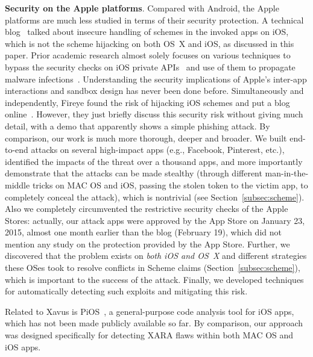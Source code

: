 \documentclass{article}
\newcommand{\ignore}[1]{}
\begin{document}
\vspace {3pt}\noindent\textbf{Security on the Apple platforms}. Compared with Android, the Apple platforms are much less studied in terms of their security protection. A technical blog~\cite{scheme2010} talked about insecure handling of schemes in the invoked apps on iOS, which is not the scheme hijacking on both OS~X and iOS, as discussed in this paper. Prior academic research almost solely focuses on various techniques to bypass the security checks on iOS private APIs~\cite{Wang:2013:JIB:2534766.2534814, DBLPHanKYBDGLZ13} and use of them to propagate malware infections~\cite{tieleiwang}.  Understanding the security implications of Apple's inter-app interactions and sandbox design has never been done before. Simultaneously and independently, Fireye found the risk of hijacking iOS schemes and put a blog online~\cite{fireeye}. However, they just briefly discuss this security risk without giving much detail, with a demo that apparently shows a simple phishing attack. By comparison, our work is much more thorough, deeper and broader. We built end-to-end attacks on several high-impact apps (e.g., Facebook, Pinterest, etc.), identified the impacts of the threat over a thousand apps, and more importantly demonstrate that the attacks can be made stealthy (through different man-in-the-middle tricks on MAC OS and iOS, passing the stolen token to the victim app, to completely conceal the attack), which is nontrivial (see Section~\ref{subsec:scheme}). Also we completely circumvented the restrictive security checks of the Apple Stores: actually, our attack apps were approved by the App Store on January 23, 2015, almost one month earlier than the blog (February 19), which did not mention any study on the protection provided by the App Store.  Further, we discovered that the problem exists on \textit{both iOS and OS~X} and different strategies these OSes took to resolve conflicts in Scheme claims (Section~\ref{subsec:scheme}), which is important to the success of the attack. \ignore{Note that our Youtube demo for the attack on OS~X schemes~\cite{supporting} was uploaded on February 5 before the blog, which \textit{only} mentions the attack on iOS schemes. }Finally, we developed techniques for automatically detecting such exploits and mitigating this risk.

Related to Xavus is PiOS~\cite{egele11:pios}, a general-purpose code analysis tool for iOS apps, which has not been made publicly available so far.  By comparison, our approach was designed specifically for detecting XARA flaws within both MAC OS and iOS apps.
\end{document}
